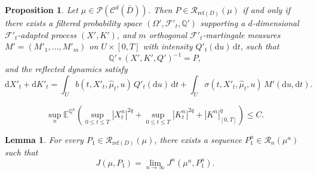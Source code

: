 \documentclass[10pt,a4paper]{amsart}
\newtheorem{proposition}{Proposition}
\newtheorem{lemma}{Lemma}
\begin{document}
\begin{proposition} \label{rep martingale for Reflected dynamics}
Let $\mu \in \mathcal{P}(\mathcal{C}^{d}(\bar D))$. 
Then $P \in \mathcal{R}_{\mathrm{ref}(D)}(\mu)$ if and only if there exists a filtered probability space 
$(\Omega', \mathcal{F}'_t, \mathbb{Q}')$
supporting a $d$-dimensional $\mathcal{F}'_t$-adapted process $(X', K')$, 
and $m$ orthogonal $\mathcal{F}'_t$-martingale measures 
$M' = (M'_1, \ldots, M'_m)$ on $U \times [0, T]$ with intensity $Q'_t(\mathrm{d}u)\, \mathrm{d}t$, such that
\begin{equation*}
\mathbb{Q}' \circ (X', K', Q')^{-1} = P,
\end{equation*}
and the reflected dynamics satisfy
\begin{equation} \label{rep-eq1}
\mathrm{d}X'_t+ \mathrm{d}K'_t 
= \displaystyle\int_U b(t, X'_t, \hat{\mu}_t, u)\, Q'_t(\mathrm{d}u)\, \mathrm{d}t
+ \displaystyle\int_U \sigma(t, X'_t, \hat{\mu}_t, u)\, M'(\mathrm{d}u, \mathrm{d}t)
. 
\end{equation}
\end{proposition}

\begin{equation} \label{eq3.1}
\sup_n \mathbb{E}^{\mathbb{Q}^n} \left( \sup_{0 \leq t \leq T} |X^n_t|^{2q} + \sup_{0 \leq t \leq T} |K^n_t|^{2q} + |K^n|^q_{[0,T]} \right) \leq C.
\end{equation}

\begin{lemma}\label{adjointlemma}
For every $ P_1 \in \mathcal{R}_{\mathrm{ref}(D)}(\mu)$, 
there exists a sequence 
$ P_1^{n} \in \mathcal{R}_n(\mu^n) $ such that
\begin{equation}\label{optimalestimation}
J(\mu, P_1)
= 
\lim_{n \to \infty} J^{n}(\mu^{n}, P_1^{n}).
\end{equation}
\end{lemma}
\end{document}
